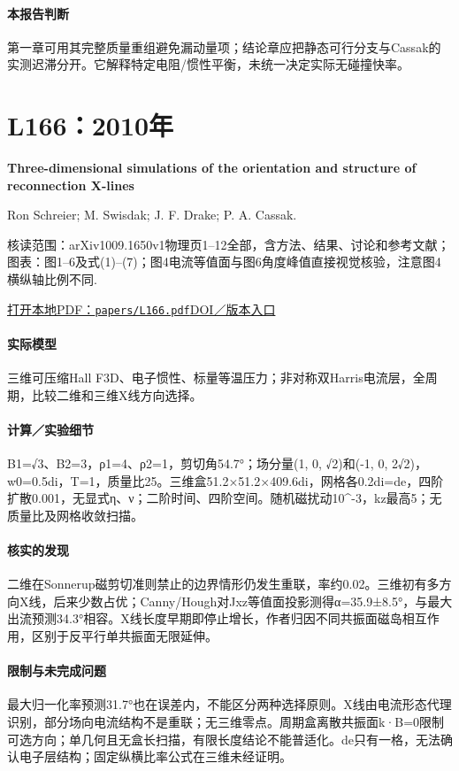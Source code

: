 \paragraph{本报告判断}第一章可用其完整质量重组避免漏动量项；结论章应把静态可行分支与Cassak的实测迟滞分开。它解释特定电阻/惯性平衡，未统一决定实际无碰撞快率。

\section{L166：2010年}\label{paper:L166}

\textbf{Three-dimensional simulations of the orientation and structure of reconnection X-lines}\citep{L166}\

Ron Schreier;  M. Swisdak;  J. F. Drake;  P. A. Cassak.

\textsf{核读范围：}arXiv1009.1650v1物理页1–12全部，含方法、结果、讨论和参考文献；\textsf{图表：}图1–6及式(1)–(7)；图4电流等值面与图6角度峰值直接视觉核验，注意图4横纵轴比例不同.

\href{run:papers/L166.pdf}{打开本地PDF：\texttt{papers/L166.pdf}}\quad\href{https://doi.org/10.1063/1.3494218}{DOI／版本入口}

\paragraph{实际模型}三维可压缩Hall F3D、电子惯性、标量等温压力；非对称双Harris电流层，全周期，比较二维和三维X线方向选择。

\paragraph{计算／实验细节}B1=√3、B2=3，ρ1=4、ρ2=1，剪切角54.7°；场分量(1, 0, √2)和(-1, 0, 2√2)，w0=0.5di，T=1，质量比25。三维盒51.2×51.2×409.6di，网格各0.2di=de，四阶扩散0.001，无显式η、ν；二阶时间、四阶空间。随机磁扰动10\textasciicircum{}-3，kz最高5；无质量比及网格收敛扫描。

\paragraph{核实的发现}二维在Sonnerup磁剪切准则禁止的边界情形仍发生重联，率约0.02。三维初有多方向X线，后来少数占优；Canny/Hough对Jxz等值面投影测得α=35.9±8.5°，与最大出流预测34.3°相容。X线长度早期即停止增长，作者归因不同共振面磁岛相互作用，区别于反平行单共振面无限延伸。

\paragraph{限制与未完成问题}最大归一化率预测31.7°也在误差内，不能区分两种选择原则。X线由电流形态代理识别，部分场向电流结构不是重联；无三维零点。周期盒离散共振面k·B=0限制可选方向；单几何且无盒长扫描，有限长度结论不能普适化。de只有一格，无法确认电子层结构；固定纵横比率公式在三维未经证明。

